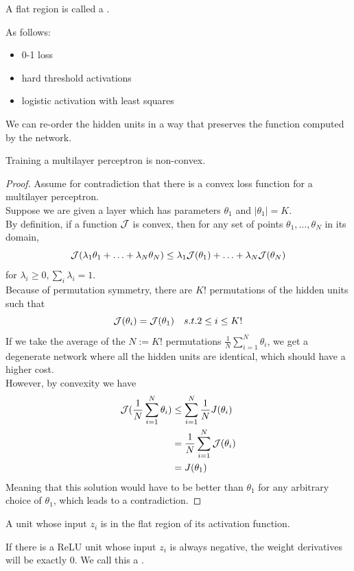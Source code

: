 \documentclass[11pt]{article}
\begin{document}
A flat region is called a .

\example
As follows:
\begin{itemize}
	\item 0-1 loss
	\item hard threshold activations
	\item logistic activation with least squares
\end{itemize}
We can re-order the hidden units in a way that preserves the function computed by the network.

\fact
Training a multilayer perceptron is non-convex.
\begin{proof}
	Assume for contradiction that there is a convex loss function for a multilayer perceptron.\\
	Suppose we are given a layer which has parameters $\theta_1$ and $|\theta_1| = K$.\\
	By definition, if a function $\mathcal{J}$ is convex, then for any set of points $\theta_1, \hdots, \theta_N$ in its domain,
	$$\mathcal{J}(\lambda_1 \theta_1 + \hdots + \lambda_N \theta_N) \leq \lambda_1\mathcal{J}(\theta_1) + \hdots + \lambda_N \mathcal{J}(\theta_N)$$ for $\lambda_i \geq 0, \sum_i \lambda_i = 1$.\\
	Because of permutation symmetry, there are $K!$ permutations of the hidden units such that $$\mathcal{J}(\theta_i) = \mathcal{J}(\theta_1) \quad s.t. 2\leq i \leq K!$$
	If we take the average of the $N:= K!$ permutations $\frac{1}{N}\sum_{i=1}^N \theta_i$, we get a degenerate network where all the hidden units are identical, which should have a higher cost. \\
	However, by convexity we have
	\begin{align*}
		\mathcal{J}(\frac{1}{N} \sum_{i=1}^N \theta_i) &\leq \sum_{i=1}^N \frac{1}{N}J(\theta_i) \\
		&= \frac{1}{N}\sum_{i=1}^N \mathcal{J}(\theta_i) \\
		&= J(\theta_1)
	\end{align*}
	Meaning that this solution would have to be better than $\theta_1$ for any arbitrary choice of $\theta_1$, which leads to a contradiction.
	
\end{proof}

A unit whose input $z_i$ is in the flat region of its activation function.

If there is a ReLU unit whose input $z_i$ is always negative, the weight derivatives will be exactly 0. We call this a .
\end{document}
